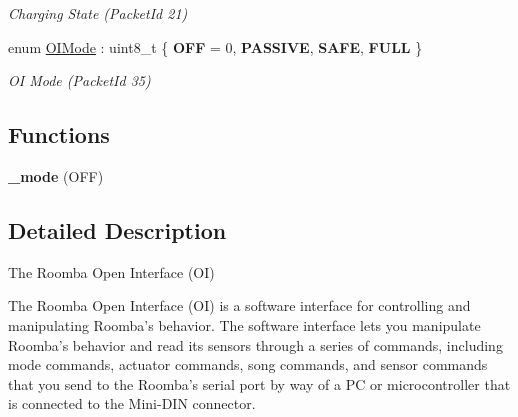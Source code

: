 \begin{DoxyCompactItemize}
\begin{DoxyCompactList}\small\item\em Charging State (Packet\+Id 21) \end{DoxyCompactList}\item 
\hypertarget{namespaceroomba_1_1series500_1_1oi_a8dde6b4ac23e862ae50868c3963d7063}{enum \hyperlink{namespaceroomba_1_1series500_1_1oi_a8dde6b4ac23e862ae50868c3963d7063}{O\+I\+Mode} \+: uint8\+\_\+t \{ {\bfseries O\+F\+F} = 0, 
{\bfseries P\+A\+S\+S\+I\+V\+E}, 
{\bfseries S\+A\+F\+E}, 
{\bfseries F\+U\+L\+L}
 \}}\label{namespaceroomba_1_1series500_1_1oi_a8dde6b4ac23e862ae50868c3963d7063}

\begin{DoxyCompactList}\small\item\em O\+I Mode (Packet\+Id 35) \end{DoxyCompactList}\end{DoxyCompactItemize}
\subsection*{Functions}
\begin{DoxyCompactItemize}
\item 
\hypertarget{namespaceroomba_1_1series500_1_1oi_a378fc26d801a71128dc75a42a876551d}{{\bfseries \+\_\+mode} (O\+F\+F)}\label{namespaceroomba_1_1series500_1_1oi_a378fc26d801a71128dc75a42a876551d}

\end{DoxyCompactItemize}


\subsection{Detailed Description}
The Roomba Open Interface (O\+I) 

The Roomba Open Interface (O\+I) is a software interface for controlling and manipulating Roomba’s behavior. The software interface lets you manipulate Roomba’s behavior and read its sensors through a series of commands, including mode commands, actuator commands, song commands, and sensor commands that you send to the Roomba’s serial port by way of a P\+C or microcontroller that is connected to the Mini-\/\+D\+I\+N connector. 